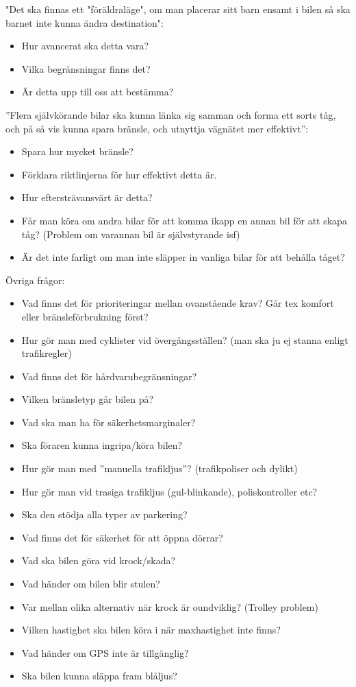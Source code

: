 \documentclass[10pt]{article}
\begin{document}
\noindent"Det ska finnas ett "föräldraläge", om man placerar sitt barn ensamt i bilen så ska barnet inte kunna ändra destination":
\begin{itemize}
\item Hur avancerat ska detta vara?
\item Vilka begränsningar finns det?
\item Är detta upp till oss att bestämma?
\end{itemize}
\hfill \break

\noindent ”Flera självkörande bilar ska kunna länka sig samman och forma ett sorts tåg, och på så vis kunna spara bränsle, och utnyttja vägnätet mer effektivt”:
\begin{itemize}
\item Spara hur mycket bränsle?
\item Förklara riktlinjerna för hur effektivt detta är.
\item Hur eftersträvansvärt är detta?
\item Får man köra om andra bilar för att komma ikapp en annan bil för att skapa tåg? (Problem om varannan bil är självstyrande isf)
\item Är det inte farligt om man inte släpper in vanliga bilar för att behålla tåget? 
\end{itemize}
\hfill \break

\noindent Övriga frågor:
\begin{itemize}
\item Vad finns det för prioriteringar mellan ovanstående krav? Går tex komfort eller bränsleförbrukning först?
\item Hur gör man med cyklister vid övergångsställen? (man ska ju ej stanna enligt trafikregler)
\item Vad finns det för hårdvarubegränsningar?
\item Vilken bränsletyp går bilen på?
\item Vad ska man ha för säkerhetsmarginaler?
\item Ska föraren kunna ingripa/köra bilen?
\item Hur gör man med ”manuella trafikljus”? (trafikpoliser och dylikt)
\item Hur gör man vid trasiga trafikljus (gul-blinkande), poliskontroller etc?
\item Ska den stödja alla typer av parkering?
\item Vad finns det för säkerhet för att öppna dörrar?
\item Vad ska bilen göra vid krock/skada?
\item Vad händer om bilen blir stulen?
\item Var mellan olika alternativ när krock är oundviklig? (Trolley problem)
\item Vilken hastighet ska bilen köra i när maxhastighet inte finns?
\item Vad händer om GPS inte är tillgänglig?
\item Ska bilen kunna släppa fram blåljus?
\end{itemize}
\end{document}
